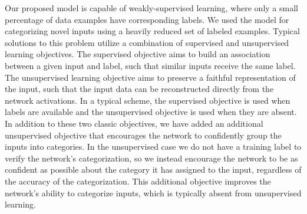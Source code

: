 Our proposed model is capable of weakly-supervised learning, where only a small percentage of data examples have corresponding labels. We used the model for categorizing novel inputs using a heavily reduced set of labeled examples. Typical solutions to this problem utilize a combination of supervised and unsupervised learning objectives. The supervised objective aims to build an association between a given input and label, such that similar inputs receive the same label. The unsupervised learning objective aims to preserve a faithful representation of the input, such that the input data can be reconstructed directly from the network activations. In a typical scheme, the supervised objective is used when labels are available and the unsupervised objective is used when they are absent. In addition to these two classic objectives, we have added an additional unsupervised objective that encourages the network to confidently group the inputs into categories. In the unsupervised case we do not have a training label to verify the network’s categorization, so we instead encourage the network to be as confident as possible about the category it has assigned to the input, regardless of the accuracy of the categorization. This additional objective improves the network’s ability to categorize inputs, which is typically absent from unsupervised learning.


